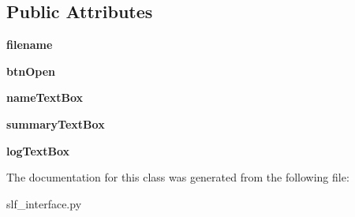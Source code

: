 \subsection*{Public Attributes}
\begin{DoxyCompactItemize}
\item 
{\bfseries filename}\hypertarget{classslf__interface_1_1_serafin_tool_interface_a384a2dba13736bb4db10f2b2757d54b0}{}\label{classslf__interface_1_1_serafin_tool_interface_a384a2dba13736bb4db10f2b2757d54b0}

\item 
{\bfseries btn\+Open}\hypertarget{classslf__interface_1_1_serafin_tool_interface_a5565dca9c29e5950da4d2f48545d51d2}{}\label{classslf__interface_1_1_serafin_tool_interface_a5565dca9c29e5950da4d2f48545d51d2}

\item 
{\bfseries name\+Text\+Box}\hypertarget{classslf__interface_1_1_serafin_tool_interface_a3dc72cac6ff53951912676f5dcf2409f}{}\label{classslf__interface_1_1_serafin_tool_interface_a3dc72cac6ff53951912676f5dcf2409f}

\item 
{\bfseries summary\+Text\+Box}\hypertarget{classslf__interface_1_1_serafin_tool_interface_a945d647b89ee9f5a77d20c62b0cff482}{}\label{classslf__interface_1_1_serafin_tool_interface_a945d647b89ee9f5a77d20c62b0cff482}

\item 
{\bfseries log\+Text\+Box}\hypertarget{classslf__interface_1_1_serafin_tool_interface_a788f95866b15c725a7ed9b0b1b6b87eb}{}\label{classslf__interface_1_1_serafin_tool_interface_a788f95866b15c725a7ed9b0b1b6b87eb}

\end{DoxyCompactItemize}


The documentation for this class was generated from the following file\+:\begin{DoxyCompactItemize}
\item 
slf\+\_\+interface.\+py\end{DoxyCompactItemize}
